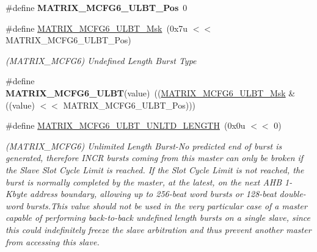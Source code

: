 \begin{DoxyCompactItemize}
\mbox{\label{group__SAMS70__MATRIX_gae3d80417bd7396dc8666871c2f261889}} 
\#define {\bfseries M\+A\+T\+R\+I\+X\+\_\+\+M\+C\+F\+G6\+\_\+\+U\+L\+B\+T\+\_\+\+Pos}~0
\item 
\mbox{\label{group__SAMS70__MATRIX_ga74f4a388f3bd82ba8549d384f5710a1c}} 
\#define \mbox{\hyperlink{group__SAMS70__MATRIX_ga74f4a388f3bd82ba8549d384f5710a1c}{M\+A\+T\+R\+I\+X\+\_\+\+M\+C\+F\+G6\+\_\+\+U\+L\+B\+T\+\_\+\+Msk}}~(0x7u $<$$<$ M\+A\+T\+R\+I\+X\+\_\+\+M\+C\+F\+G6\+\_\+\+U\+L\+B\+T\+\_\+\+Pos)
\begin{DoxyCompactList}\small\item\em (M\+A\+T\+R\+I\+X\+\_\+\+M\+C\+F\+G6) Undefined Length Burst Type \end{DoxyCompactList}\item 
\mbox{\label{group__SAMS70__MATRIX_ga3e9605229ab87527cade2bd02098ac2f}} 
\#define {\bfseries M\+A\+T\+R\+I\+X\+\_\+\+M\+C\+F\+G6\+\_\+\+U\+L\+BT}(value)~((\mbox{\hyperlink{group__SAMS70__MATRIX_ga74f4a388f3bd82ba8549d384f5710a1c}{M\+A\+T\+R\+I\+X\+\_\+\+M\+C\+F\+G6\+\_\+\+U\+L\+B\+T\+\_\+\+Msk}} \& ((value) $<$$<$ M\+A\+T\+R\+I\+X\+\_\+\+M\+C\+F\+G6\+\_\+\+U\+L\+B\+T\+\_\+\+Pos)))
\item 
\mbox{\label{group__SAMS70__MATRIX_gaaa9d8ed734e988917b19f9b3486671af}} 
\#define \mbox{\hyperlink{group__SAMS70__MATRIX_gaaa9d8ed734e988917b19f9b3486671af}{M\+A\+T\+R\+I\+X\+\_\+\+M\+C\+F\+G6\+\_\+\+U\+L\+B\+T\+\_\+\+U\+N\+L\+T\+D\+\_\+\+L\+E\+N\+G\+TH}}~(0x0u $<$$<$ 0)
\begin{DoxyCompactList}\small\item\em (M\+A\+T\+R\+I\+X\+\_\+\+M\+C\+F\+G6) Unlimited Length Burst-\/\+No predicted end of burst is generated, therefore I\+N\+CR bursts coming from this master can only be broken if the Slave Slot Cycle Limit is reached. If the Slot Cycle Limit is not reached, the burst is normally completed by the master, at the latest, on the next A\+HB 1-\/Kbyte address boundary, allowing up to 256-\/beat word bursts or 128-\/beat double-\/word bursts.\+This value should not be used in the very particular case of a master capable of performing back-\/to-\/back undefined length bursts on a single slave, since this could indefinitely freeze the slave arbitration and thus prevent another master from accessing this slave. \end{DoxyCompactList}\item 
$$
\end{DoxyCompactItemize}
